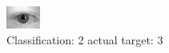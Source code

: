 \begin{figure}[h!]
\begin{center}
\includegraphics[width=0.60\columnwidth]{figures/ID612_class_2_target_3.png}
\end{center}
\caption{ Classification: 2 actual target: 3}
\label{fig:ID612_class_2_target_3}
\end{figure}
